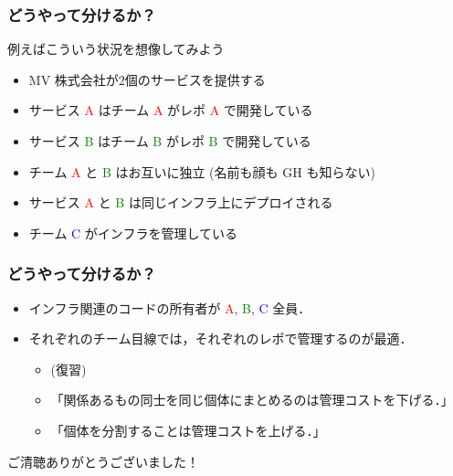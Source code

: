 \begin{frame}
    \frametitle{どうやって分けるか？}
    例えばこういう状況を想像してみよう
    \begin{itemize}
        \item<2-> MV 株式会社が2個のサービスを提供する
        \item<3-> サービス \textcolor{red}{A} はチーム \textcolor{red}{A} がレポ \textcolor{red}{A} で開発している
        \item<4-> サービス \textcolor{green}{B} はチーム \textcolor{green}{B} がレポ \textcolor{green}{B} で開発している
        \item<5-> チーム \textcolor{red}{A} と \textcolor{green}{B} はお互いに独立 (名前も顔も GH も知らない)
        \item<6-> サービス \textcolor{red}{A} と \textcolor{green}{B} は同じインフラ上にデプロイされる
        \item<7-> チーム \textcolor{blue}{C} がインフラを管理している
    \end{itemize}
\end{frame}

\begin{frame}
    \frametitle{どうやって分けるか？}
    \begin{itemize}
        \item<2-> インフラ関連のコードの所有者が \textcolor{red}{A}, \textcolor{green}{B}, \textcolor{blue}{C} 全員．
        \item<3-> それぞれのチーム目線では，それぞれのレポで管理するのが最適．
        \begin{itemize}
            \item<4-> (復習)
            \item<5->「関係あるもの同士を同じ個体にまとめるのは管理コストを下げる．」
            \item<6->「個体を分割することは管理コストを上げる．」
        \end{itemize}
    \end{itemize}
\end{frame}

\begin{frame}
    \LARGE
    ご清聴ありがとうございました！
\end{frame}

\begin{frame}
    \LARGE
\end{frame}

